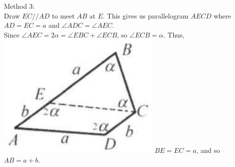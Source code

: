 \documentclass{article}
\begin{document}
Method 3:\\
Draw \(E C / / A D\) to meet \(A B\) at \(E\). This gives us parallelogram \(A E C D\) where \(A D=E C=a\) and \(\angle A D C=\angle A E C\).\\
Since \(\angle A E C=2 \alpha=\angle E B C+\angle E C B\), so \(\angle E C B=\alpha\). Thus,\\
\includegraphics[width=\textwidth]{images/111.jpg} \(B E=E C=a\), and so \(A B=a+b\).
\end{document}
